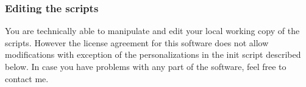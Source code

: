\documentclass[10pt,a4paper,onepage,DIV12]{scrartcl}
\begin{document}
% 
% 
%  
% 
% 

\subsubsection*{Editing the scripts}
You are technically able to manipulate and edit your local working copy of the scripts. However the license agreement for this software does not allow modifications with exception of the personalizations in the init script described below. In case you have problems with any part of the software, feel free to contact me.
\end{document}
